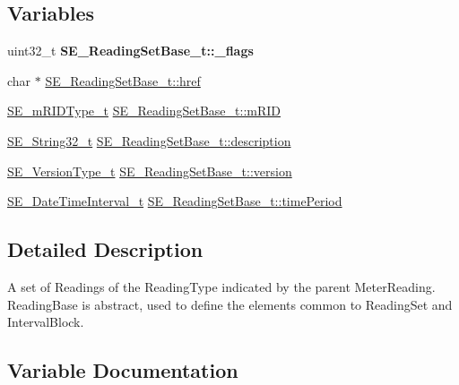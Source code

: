 \subsection*{Variables}
\begin{DoxyCompactItemize}
\item 
\mbox{\label{group__ReadingSetBase_ga06de15c739974e8fda5eed67aa4217c8}} 
uint32\+\_\+t {\bfseries S\+E\+\_\+\+Reading\+Set\+Base\+\_\+t\+::\+\_\+flags}
\item 
char $\ast$ \hyperlink{group__ReadingSetBase_ga4c94838462ed93e356089d894b4b408d}{S\+E\+\_\+\+Reading\+Set\+Base\+\_\+t\+::href}
\item 
\hyperlink{group__mRIDType_gac74622112f3a388a2851b2289963ba5e}{S\+E\+\_\+m\+R\+I\+D\+Type\+\_\+t} \hyperlink{group__ReadingSetBase_ga7189226865c8cc699d86933793edbe14}{S\+E\+\_\+\+Reading\+Set\+Base\+\_\+t\+::m\+R\+ID}
\item 
\hyperlink{group__String32_gac9f59b06b168b4d2e0d45ed41699af42}{S\+E\+\_\+\+String32\+\_\+t} \hyperlink{group__ReadingSetBase_ga6e8ece381fda08a0af90abd901be7aec}{S\+E\+\_\+\+Reading\+Set\+Base\+\_\+t\+::description}
\item 
\hyperlink{group__VersionType_ga4b8d27838226948397ed99f67d46e2ae}{S\+E\+\_\+\+Version\+Type\+\_\+t} \hyperlink{group__ReadingSetBase_gacf87694263f9fa1022f9d5a28d2eb694}{S\+E\+\_\+\+Reading\+Set\+Base\+\_\+t\+::version}
\item 
\hyperlink{structSE__DateTimeInterval__t}{S\+E\+\_\+\+Date\+Time\+Interval\+\_\+t} \hyperlink{group__ReadingSetBase_ga4da03480f642318baf9793c7ff5e1006}{S\+E\+\_\+\+Reading\+Set\+Base\+\_\+t\+::time\+Period}
\end{DoxyCompactItemize}


\subsection{Detailed Description}
A set of Readings of the Reading\+Type indicated by the parent Meter\+Reading. Reading\+Base is abstract, used to define the elements common to Reading\+Set and Interval\+Block. 

\subsection{Variable Documentation}
\mbox{\label{group__ReadingSetBase_ga6e8ece381fda08a0af90abd901be7aec}} 
